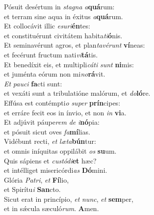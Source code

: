 \oddverse Pósuit desértum in \textit{sta}\textit{gna} \textit{a}\textbf{quá}rum:~\*\\
\oddverse et terram sine aqua in éxitus \textit{a}\textbf{quá}rum.\\
\evenverse Et collocávit illic \textit{e}\textit{su}\textit{ri}\textbf{én}tes:~\*\\
\evenverse et constituérunt civitátem habita\textit{ti}\textbf{ó}nis.\\
\oddverse Et seminavérunt agros, et plan\textit{ta}\textit{vé}\textit{runt} \textbf{ví}neas:~\*\\
\oddverse et fecérunt fructum nati\textit{vi}\textbf{tá}tis.\\
\evenverse Et benedíxit eis, et multipli\textit{cá}\textit{ti} \textit{sunt} \textbf{ni}mis:~\*\\
\evenverse et juménta eórum non mi\textit{no}\textbf{rá}vit.\\
\oddverse \textit{Et} \textit{pau}\textit{ci} \textbf{fa}cti sunt:~\*\\
\oddverse et vexáti sunt a tribulatióne malórum, et \textit{do}\textbf{ló}re.\\
\evenverse Effúsa est contémpti\textit{o} \textit{su}\textit{per} \textbf{prín}cipes:~\*\\
\evenverse et erráre fecit eos in ínvio, et non \textit{in} \textbf{vi}a.\\
\oddverse Et adjúvit páupe\textit{rem} \textit{de} \textit{i}\textbf{nó}pia:~\*\\
\oddverse et pósuit sicut oves \textit{fa}\textbf{mí}lias.\\
\evenverse Vidébunt recti, \textit{et} \textit{læ}\textit{ta}\textbf{bún}tur:~\*\\
\evenverse et omnis iníquitas oppilábit \textit{os} \textbf{su}um.\\
\oddverse Quis sápiens et \textit{cu}\textit{stó}\textit{di}\textbf{et} hæc?~\*\\
\oddverse et intélliget misericórdi\textit{as} \textbf{Dó}mini.\\
\evenverse Glória \textit{Pa}\textit{tri}, \textit{et} \textbf{Fí}lio,~\*\\
\evenverse et Spirítu\textit{i} \textbf{San}cto.\\
\oddverse Sicut erat in princípio, \textit{et} \textit{nunc}, \textit{et} \textbf{sem}per,~\*\\
\oddverse et in sǽcula sæculó\textit{rum}. \textbf{A}men.\\
